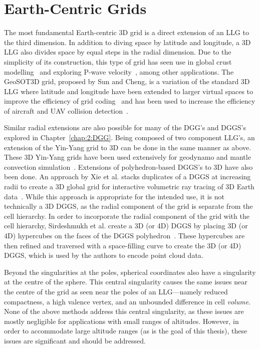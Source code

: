 \section{Earth-Centric Grids} \label{chap:3:earthCentric}
The most fundamental Earth-centric 3D grid is a direct extension of an LLG to the third dimension.
In addition to diving space by latitude and longitude, a 3D LLG also divides space by equal steps in the radial dimension.
Due to the simplicity of its construction, this type of grid has seen use in global crust modelling~\cite{bassin2000current} and exploring P-wave velocity~\cite{zhao2004global}, among other applications.
The GeoSOT3D grid, proposed by Sun and Cheng, is a variation of the standard 3D LLG where latitude and longitude have been extended to larger virtual spaces to improve the efficiency of grid coding~\cite{sun20153d} and has been used to increase the efficiency of aircraft and UAV collision detection~\cite{miao2019low, zhai2019collision}.


Similar radial extensions are also possible for many of the DGG's and DGGS's explored in Chapter~\ref{chap:2:DGG}.
Being composed of two component LLG's, an extension of the Yin-Yang grid to 3D can be done in the same manner as above.
These 3D Yin-Yang grids have been used extensively for geodynamo and mantle convection simulation~\cite{yoshida2004application, kageyama2005geodynamo, tackley2008modelling}.
Extensions of polyhedron-based DGGS's to 3D have also been done.
An approach by Xie et al. stacks duplicates of a DGGS at increasing radii to create a 3D global grid for interactive volumetric ray tracing of 3D Earth data~\cite{xie2013interactive}.
While this approach is appropriate for the intended use, it is not technically a 3D DGGS, as the radial component of the grid is separate from the cell hierarchy.
In order to incorporate the radial component of the grid with the cell hierarchy, Sirdeshmukh et al. create a 3D (or 4D) DGGS by placing 3D (or 4D) hypercubes on the faces of the DGGS polyhedron~\cite{sirdeshmukh2019utilizing}.
These hypercubes are then refined and traversed with a space-filling curve to create the 3D (or 4D) DGGS, which is used by the authors to encode point cloud data.


Beyond the singularities at the poles, spherical coordinates also have a singularity at the centre of the sphere.
This central singularity causes the same issues near the centre of the grid as seen near the poles of an LLG---namely reduced compactness, a high valence vertex, and an unbounded difference in cell \textit{volume}.
None of the above methods address this central singularity, as these issues are mostly negligible for applications with small ranges of altitudes.
However, in order to accommodate large altitude ranges (as is the goal of this thesis), these issues are significant and should be addressed.


